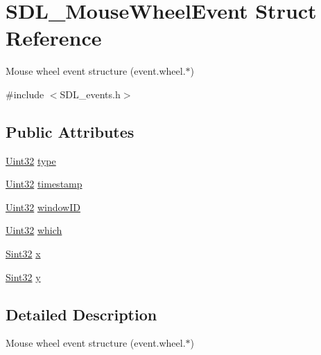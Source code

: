 \hypertarget{struct_s_d_l___mouse_wheel_event}{\section{S\-D\-L\-\_\-\-Mouse\-Wheel\-Event Struct Reference}
\label{struct_s_d_l___mouse_wheel_event}
}


Mouse wheel event structure (event.\-wheel.$\ast$)  




{\ttfamily \#include $<$S\-D\-L\-\_\-events.\-h$>$}

\subsection*{Public Attributes}
\begin{DoxyCompactItemize}
\item 
\hyperlink{_s_d_l__stdinc_8h_add440eff171ea5f55cb00c4a9ab8672d}{Uint32} \hyperlink{struct_s_d_l___mouse_wheel_event_aa6b741e99df708c6f9550ee0f520fb70}{type}
\item 
\hyperlink{_s_d_l__stdinc_8h_add440eff171ea5f55cb00c4a9ab8672d}{Uint32} \hyperlink{struct_s_d_l___mouse_wheel_event_a83ad52c80ff49a8e75dc6c33bba65fa0}{timestamp}
\item 
\hyperlink{_s_d_l__stdinc_8h_add440eff171ea5f55cb00c4a9ab8672d}{Uint32} \hyperlink{struct_s_d_l___mouse_wheel_event_ab45eb1895217214ecb773fc555e08f6c}{window\-I\-D}
\item 
\hyperlink{_s_d_l__stdinc_8h_add440eff171ea5f55cb00c4a9ab8672d}{Uint32} \hyperlink{struct_s_d_l___mouse_wheel_event_a014dc767d52e8b75ba26a5f12e1704e8}{which}
\item 
\hyperlink{_s_d_l__stdinc_8h_a7a90b941db9d4582e9ad7abb9940ff7e}{Sint32} \hyperlink{struct_s_d_l___mouse_wheel_event_a6d904eef474ea45a5b1828fcb5b0f859}{x}
\item 
\hyperlink{_s_d_l__stdinc_8h_a7a90b941db9d4582e9ad7abb9940ff7e}{Sint32} \hyperlink{struct_s_d_l___mouse_wheel_event_a53fdf77a464426bc8b30e629795f044b}{y}
\end{DoxyCompactItemize}


\subsection{Detailed Description}
Mouse wheel event structure (event.\-wheel.$\ast$) 

